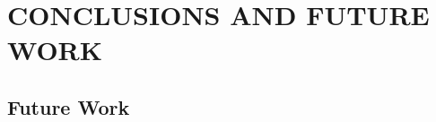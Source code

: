 


\section{\uppercase{Conclusions and Future Work}}
\label{sec:conclusion}
\noindent


\subsection*{Future Work}
\label{subsec:conclusion:futurework}

